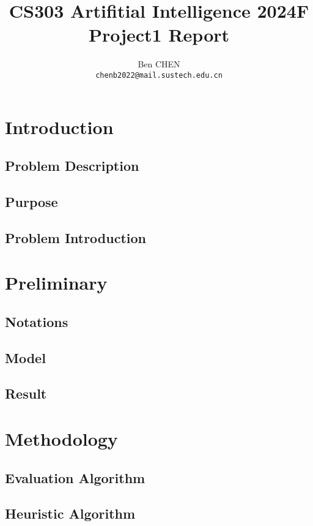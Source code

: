 \documentclass{article}
\title{\textbf{CS303 Artifitial Intelligence 2024F Project1 Report}}
\author{Ben CHEN \\ \texttt{chenb2022@mail.sustech.edu.cn}}
\begin{document}
\maketitle

\section{Introduction}

\subsection{Problem Description}

\subsection{Purpose}

\subsection{Problem Introduction}

\section{Preliminary}

\subsection{Notations}

\subsection{Model}

\subsection{Result}

\section{Methodology}

\subsection{Evaluation Algorithm}

\subsection{Heuristic Algorithm}
\end{document}
